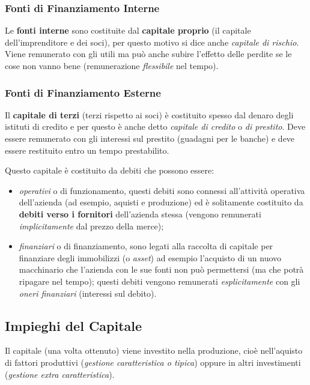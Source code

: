 \documentclass[a4paper,portrait,12pt]{article}
\theoremstyle{definition}
\begin{document}
\subsubsection{Fonti di Finanziamento Interne}
Le \textbf{fonti interne} sono costituite dal \textbf{capitale proprio} (il capitale dell'imprenditore e dei soci), per questo motivo si dice anche \emph{capitale di rischio}.
Viene remunerato con gli utili ma può anche subire l'effetto delle perdite se le cose non vanno bene (remunerazione \emph{flessibile} nel tempo).

\subsubsection{Fonti di Finanziamento Esterne}
Il \textbf{capitale di terzi} (terzi rispetto ai soci) è costituito spesso dal denaro degli istituti di credito e per questo è anche detto \emph{capitale di credito} o \emph{di prestito}.
Deve essere remunerato con gli interessi sul prestito (guadagni per le banche) e deve essere restituito entro un tempo prestabilito.

Questo capitale è costituito da debiti che possono essere:
\begin{itemize}
\item \emph{operativi} o di funzionamento, questi debiti sono connessi all'attività operativa dell'azienda (ad esempio, aquisti e produzione) ed è solitamente costituito da \textbf{debiti verso i fornitori} dell'azienda stessa (vengono remunerati \emph{implicitamente} dal prezzo della merce);
\item \emph{finanziari} o di finanziamento, sono legati alla raccolta di capitale per finanziare degli immobilizzi (o \emph{asset}) ad esempio l'acquisto di un nuovo macchinario che l'azienda con le sue fonti non può permettersi (ma che potrà ripagare nel tempo); questi debiti vengono remunerati \emph{esplicitamente} con gli \emph{oneri finanziari} (interessi sul debito).
\end{itemize} 


\subsection{Impieghi del Capitale}

Il capitale (una volta ottenuto) viene investito nella produzione, cioè nell'aquisto di fattori produttivi (\emph{gestione caratteristica o tipica}) oppure in altri investimenti (\emph{gestione extra caratteristica}).\\
\end{document}
